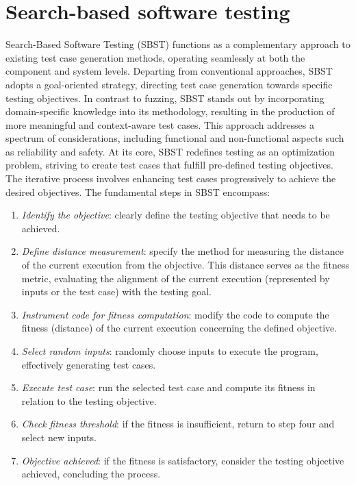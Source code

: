 \section{Search-based software testing}
Search-Based Software Testing (SBST) functions as a complementary approach to existing test case generation methods, operating seamlessly at both the component and system levels. 
Departing from conventional approaches, SBST adopts a goal-oriented strategy, directing test case generation towards specific testing objectives.
In contrast to fuzzing, SBST stands out by incorporating domain-specific knowledge into its methodology, resulting in the production of more meaningful and context-aware test cases. 
This approach addresses a spectrum of considerations, including functional and non-functional aspects such as reliability and safety.
At its core, SBST redefines testing as an optimization problem, striving to create test cases that fulfill pre-defined testing objectives. 
The iterative process involves enhancing test cases progressively to achieve the desired objectives. 
The fundamental steps in SBST encompass:
\begin{enumerate}
    \item \textit{Identify the objective}: clearly define the testing objective that needs to be achieved.
    \item \textit{Define distance measurement}: specify the method for measuring the distance of the current execution from the objective. 
        This distance serves as the fitness metric, evaluating the alignment of the current execution (represented by inputs or the test case) with the testing goal.
    \item \textit{Instrument code for fitness computation}: modify the code to compute the fitness (distance) of the current execution concerning the defined objective.
    \item \textit{Select random inputs}: randomly choose inputs to execute the program, effectively generating test cases.
    \item \textit{Execute test case}: run the selected test case and compute its fitness in relation to the testing objective.
    \item \textit{Check fitness threshold}: if the fitness is insufficient, return to step four and select new inputs.
    \item \textit{Objective achieved}: if the fitness is satisfactory, consider the testing objective achieved, concluding the process.
\end{enumerate}

